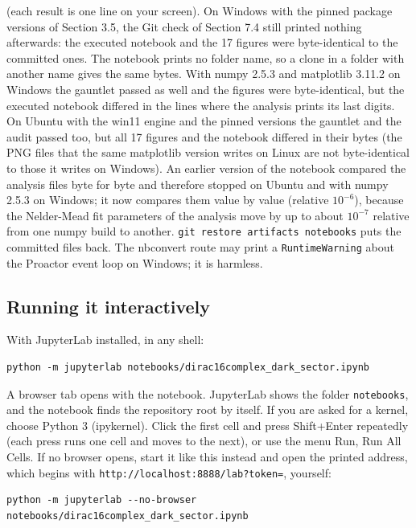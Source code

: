\documentclass[11pt]{article}
\begin{document}
(each result is one line on your screen). On Windows with the pinned package versions of Section 3.5, the Git check of Section 7.4 still printed nothing afterwards: the executed notebook and the 17 figures were byte-identical to the committed ones. The notebook prints no folder name, so a clone in a folder with another name gives the same bytes. With numpy 2.5.3 and matplotlib 3.11.2 on Windows the gauntlet passed as well and the figures were byte-identical, but the executed notebook differed in the lines where the analysis prints its last digits. On Ubuntu with the win11 engine and the pinned versions the gauntlet and the audit passed too, but all 17 figures and the notebook differed in their bytes (the PNG files that the same matplotlib version writes on Linux are not byte-identical to those it writes on Windows). An earlier version of the notebook compared the analysis files byte for byte and therefore stopped on Ubuntu and with numpy 2.5.3 on Windows; it now compares them value by value (relative $10^{-6}$), because the Nelder-Mead fit parameters of the analysis move by up to about $10^{-7}$ relative from one numpy build to another. \texttt{git rest\allowbreak{}ore arti\allowbreak{}facts no\allowbreak{}tebooks} puts the committed files back. The nbconvert route may print a \texttt{RuntimeW\allowbreak{}arning} about the Proactor event loop on Windows; it is harmless.

\subsection{Running it interactively}

With JupyterLab installed, in any shell:

\begin{Verbatim}[fontsize=\small]
python -m jupyterlab notebooks/dirac16complex_dark_sector.ipynb
\end{Verbatim}

A browser tab opens with the notebook. JupyterLab shows the folder \texttt{notebook\allowbreak{}s}, and the notebook finds the repository root by itself. If you are asked for a kernel, choose Python 3 (ipykernel). Click the first cell and press Shift+Enter repeatedly (each press runs one cell and moves to the next), or use the menu Run, Run All Cells. If no browser opens, start it like this instead and open the printed address, which begins with \texttt{http://l\allowbreak{}ocalhost\allowbreak{}:8888/la\allowbreak{}b?token=}, yourself:

\begin{Verbatim}[fontsize=\small]
python -m jupyterlab --no-browser notebooks/dirac16complex_dark_sector.ipynb
\end{Verbatim}
\end{document}
